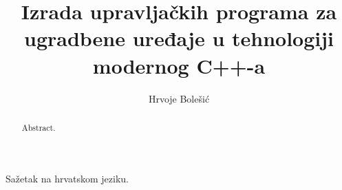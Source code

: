 \documentclass[times, utf8, diplomski]{fer}
\begin{document}

\title{Izrada upravljačkih programa za ugradbene uređaje u tehnologiji modernog C++-a}

\author{Hrvoje Bolešić}

\maketitle

\izvornik

\zahvala{}

\tableofcontents














\begin{sazetak}
Sažetak na hrvatskom jeziku.

\end{sazetak}

\begin{abstract}
Abstract.

\end{abstract}
\end{document}
